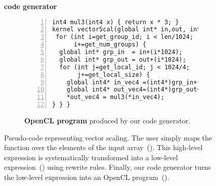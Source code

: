\begin{figure}[t]
\vspace{-10pt}
\begin{minipage}{0.1\linewidth}
\vspace{0pt}
\centering
{}
\end{minipage}
\begin{minipage}{0.26\linewidth}
\vspace{-5pt}
\centering
\textbf{code generator}
\end{minipage}
\begin{minipage}{0.1\linewidth}
\vspace{0pt}
\centering
{}
\end{minipage}

\vspace{0pt}
\begin{subfigure}[b]{\linewidth}
\centering
\begin{minipage}{.85\textwidth}
\begin{lstlisting}[mathescape,numbers=left]
int4 mul3(int4 x) { return x * 3; }
kernel vectorScal(global int* in,out, int len){
 for (int i=get_group_id; i < len/1024;
      i+=get_num_groups) {
  global int* grp_in  = in+(i*1024);
  global int* grp_out = out+(i*1024);
  for (int j=get_local_id; j < 1024/4;
       j+=get_local_size) {
    global int4* in_vec4 =(int4*)grp_in+(j*4);
    global int4* out_vec4=(int4*)grp_out+(j*4);
    *out_vec4 = mul3(*in_vec4);      
} } }  
\end{lstlisting}
\end{minipage}
\caption{\textbf{OpenCL program} produced by our code generator.}
\label{fig:codeex:ocl}
\end{subfigure}
\vspace{-20pt}
\caption{
Pseudo-code representing vector scaling.
The user simply maps the  function over the elements of the input array~().
This high-level expression is systematically transformed into a low-level expression~() using rewrite rules.
Finally, our code generator turns the low-level expression into an OpenCL program~().
}
  \label{fig:codeex}
\end{figure}

